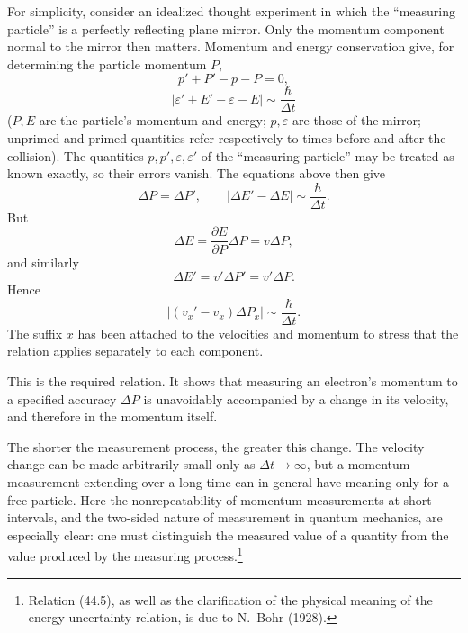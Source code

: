 For simplicity, consider an idealized thought experiment in which the
``measuring particle'' is a perfectly reflecting plane mirror. Only the
momentum component normal to the mirror then matters. Momentum and energy
conservation give, for determining the particle momentum $P$,
\begin{equation}
  p'+P'-p-P=0,
  \tag{44.3}
\end{equation}
\begin{equation}
  |\varepsilon'+E'-\varepsilon-E|\sim\frac{\hbar}{\Delta t}
  \tag{44.4}
\end{equation}
($P,E$ are the particle's momentum and energy; $p,\varepsilon$ are those of
the mirror; unprimed and primed quantities refer respectively to times before
and after the collision). The quantities $p,p',\varepsilon,\varepsilon'$ of
the ``measuring particle'' may be treated as known exactly, so their errors
vanish. The equations above then give
\[
  \Delta P=\Delta P',
  \qquad
  |\Delta E'-\Delta E|\sim\frac{\hbar}{\Delta t}.
\]
But
\[
  \Delta E=\frac{\partial E}{\partial P}\Delta P=v\Delta P,
\]
and similarly
\[
  \Delta E'=v'\Delta P'=v'\Delta P.
\]
Hence
\begin{equation}
  |(v_x'-v_x)\Delta P_x|\sim\frac{\hbar}{\Delta t}.
  \tag{44.5}
\end{equation}
The suffix $x$ has been attached to the velocities and momentum to stress
that the relation applies separately to each component.

This is the required relation. It shows that measuring an electron's momentum
to a specified accuracy $\Delta P$ is unavoidably accompanied by a change in
its velocity, and therefore in the momentum itself.

The shorter the measurement process, the greater this change. The velocity
change can be made arbitrarily small only as $\Delta t\to\infty$, but a
momentum measurement extending over a long time can in general have meaning
only for a free particle. Here the nonrepeatability of momentum measurements
at short intervals, and the two-sided nature of measurement in quantum
mechanics, are especially clear: one must distinguish the measured value of
a quantity from the value produced by the measuring process.\footnote{Relation
(44.5), as well as the clarification of the physical meaning of the energy
uncertainty relation, is due to N.~Bohr (1928).}

